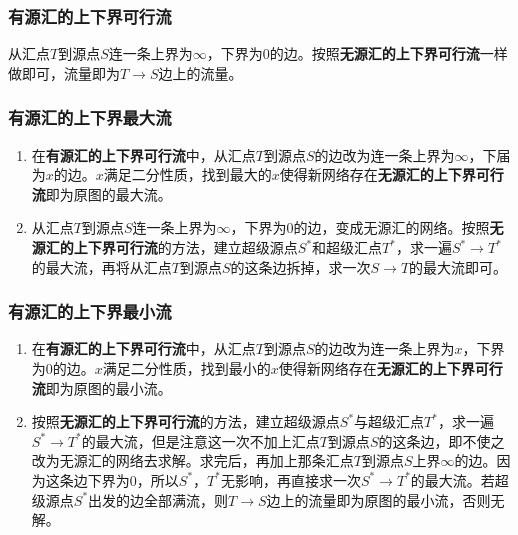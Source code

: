 \subsubsection{有源汇的上下界可行流}
从汇点$T$到源点$S$连一条上界为$\infty$，下界为$0$的边。按照\textbf{无源汇的上下界可行流}一样做即可，流量即为$T \rightarrow S$边上的流量。
\subsubsection{有源汇的上下界最大流}
\begin{enumerate}
	\item 在\textbf{有源汇的上下界可行流}中，从汇点$T$到源点$S$的边改为连一条上界为$\infty$，下届为$x$的边。$x$满足二分性质，找到最大的$x$使得新网络存在\textbf{无源汇的上下界可行流}即为原图的最大流。
	\item 从汇点$T$到源点$S$连一条上界为$\infty$，下界为$0$的边，变成无源汇的网络。按照\textbf{无源汇的上下界可行流}的方法，建立超级源点$S^*$和超级汇点$T^*$，求一遍$S^* \rightarrow T^*$的最大流，再将从汇点$T$到源点$S$的这条边拆掉，求一次$S \rightarrow T$的最大流即可。
\end{enumerate}
\subsubsection{有源汇的上下界最小流}
\begin{enumerate}
	\item 在\textbf{有源汇的上下界可行流}中，从汇点$T$到源点$S$的边改为连一条上界为$x$，下界为$0$的边。$x$满足二分性质，找到最小的$x$使得新网络存在\textbf{无源汇的上下界可行流}即为原图的最小流。
	\item 按照\textbf{无源汇的上下界可行流}的方法，建立超级源点$S^*$与超级汇点$T^*$，求一遍$S^* \rightarrow T^*$的最大流，但是注意这一次不加上汇点$T$到源点$S$的这条边，即不使之改为无源汇的网络去求解。求完后，再加上那条汇点$T$到源点$S$上界$\infty$的边。因为这条边下界为$0$，所以$S^*$，$T^*$无影响，再直接求一次$S^* \rightarrow T^*$的最大流。若超级源点$S^*$出发的边全部满流，则$T \rightarrow S$边上的流量即为原图的最小流，否则无解。
\end{enumerate}
